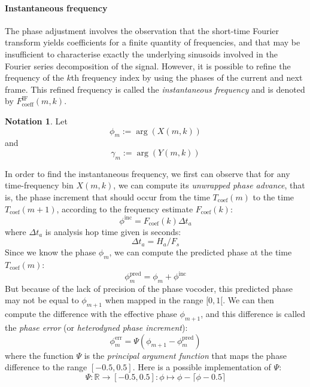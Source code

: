 \documentclass[letterpaper]{article}
\theoremstyle{definition}
\newtheorem*{notation}{Notation}
\theoremstyle{remark}
\theoremstyle{plain}
\begin{document}
\paragraph{Instantaneous frequency}
The phase adjustment involves the observation that the short-time Fourier
transform yields coefficients for a finite quantity of frequencies, and that may
be insufficient to characterise exactly the underlying sinusoids involved in the
Fourier series decomposition of the signal. However, it is possible to refine
the frequency of the \(k\)th frequency index by using the phases of the current
and next frame. This refined frequency is called the \emph{instantaneous
frequency} and is denoted by \(F_{\text{coeff}}^{\text{IF}}(m,k)\).
\begin{notation}
Let \[\phi_m:=\arg(X(m,k))\]
and \[\gamma_m:=\arg(Y(m,k))\]
\end{notation}
In order to find the instantaneous frequency, we first can observe that for any
time-frequency bin \(X(m,k)\), we can compute its \emph{unwrapped phase
advance}, that is, the phase increment that should occur from the time
\(T_{\text{coef}}(m)\) to the time \(T_{\text{coef}}(m+1)\), according to the
frequency estimate \(F_{\text{coef}}(k)\):
\begin{equation}
    \phi^{\text{inc}}=F_{\text{coef}}(k) \Delta t_a
\end{equation}
where \(\Delta t_a\) is analysis hop time given is seconds:
\begin{equation}
    \Delta t_a=H_a/F_s
\end{equation}
Since we know the phase \(\phi_m\), we can compute the predicted phase at
the time \(T_{\text{coef}}(m)\):
\begin{equation}
    \phi^{\text{pred}}_m=\phi_m + \phi^{\text{inc}}
\end{equation}
But because of the lack of precision of the phase vocoder, this predicted phase
may not be equal to \(\phi_{m+1}\) when mapped in the range \([0, 1[\).
We can then compute the difference with the effective phase \(\phi_{m+1}\), and
this difference is called the \emph{phase error} (or \emph{heterodyned phase
increment}):
\begin{equation}
    \phi^{\text{err}}_m=\Psi(\phi_{m+1} - \phi^{\text{pred}}_m)
\end{equation}
where the function \(\Psi\) is the \emph{principal argument function} that maps
the phase difference to the range \([-0.5, 0.5]\).
Here is a possible implementation of \(\Psi\):
\begin{equation}
    \Psi:\mathbb{R}\to[-0.5,0.5]:\phi\mapsto \phi - \lceil \phi-0.5 \rceil
\end{equation}
\end{document}
